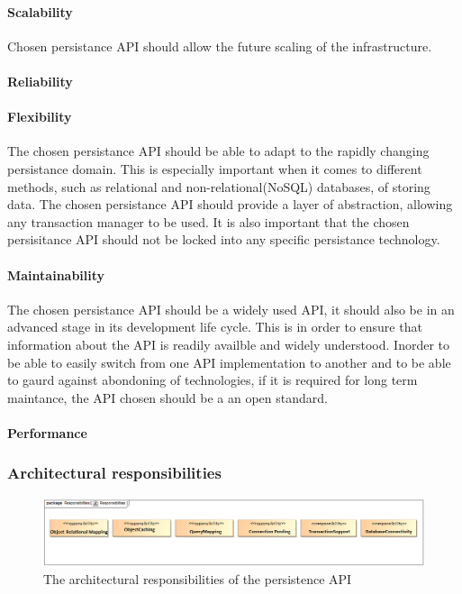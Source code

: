 \documentclass[a4paper,12pt]{report}
\begin{document}
\paragraph {Scalability}
\hfill \break
Chosen persistance API should allow the future scaling of the infrastructure.

\paragraph {Reliability}

\paragraph {Flexibility}
\hfill \break
The chosen persistance API should be able to adapt to the rapidly changing persistance domain. This is especially important when it comes to different methods, such as relational and non-relational(NoSQL) databases, of storing data. \newline 
The chosen persistance API should provide a layer of abstraction, allowing any transaction manager to be used. It is also important that the chosen persisitance API should not be locked into any specific persistance technology.

\paragraph {Maintainability}
\hfill \break
The chosen persistance API should be a widely used API, it should also be in an advanced stage in its development life cycle. This is in order to ensure that information about the API is readily availble and widely understood. Inorder to be able to easily switch from one API implementation to another and to be able to gaurd against abondoning of technologies, if it is required for long term maintance, the API chosen should be a an open standard.

\paragraph {Performance}

\subsubsection {Architectural responsibilities}
	\begin{figure}[htb]
		\centering
		\includegraphics  [scale=0.5]{../Diagrams/PersistanceResponsibiltiesZ.png}
		\caption{The architectural responsibilities of the persistence API}
	\end{figure}
\end{document}
